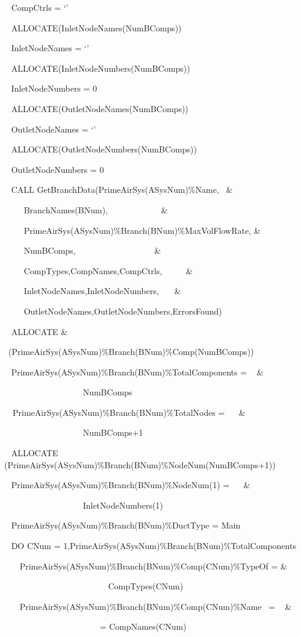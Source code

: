 ~ CompCtrls = `'

~ ALLOCATE(InletNodeNames(NumBComps))

~ InletNodeNames = `'

~ ALLOCATE(InletNodeNumbers(NumBComps))

~ InletNodeNumbers = 0

~ ALLOCATE(OutletNodeNames(NumBComps))

~ OutletNodeNames = `'

~ ALLOCATE(OutletNodeNumbers(NumBComps))

~ OutletNodeNumbers = 0

~ CALL GetBranchData(PrimeAirSys(ASysNum)\%Name,~ \&

~~~~ BranchNames(BNum),~~~~~~~~~~~~ \&

~~~~ PrimeAirSys(ASysNum)\%Branch(BNum)\%MaxVolFlowRate, \&

~~~~ NumBComps,~~~~~~~~~~~~~~~~~~ \&

~~~~ CompTypes,CompNames,CompCtrls, ~~~~~\&

~~~~ InletNodeNames,InletNodeNumbers,~~~ \&

~~~~ OutletNodeNames,OutletNodeNumbers,ErrorsFound)

~ ALLOCATE \&

~(PrimeAirSys(ASysNum)\%Branch(BNum)\%Comp(NumBComps))

~ PrimeAirSys(ASysNum)\%Branch(BNum)\%TotalComponents = ~ \&

~~~~~~~~~~~~~~~~~~ NumBComps

~~PrimeAirSys(ASysNum)\%Branch(BNum)\%TotalNodes = ~~ \&

~~~~~~~~~~~~~~~~~~ NumBComps+1

~ ALLOCATE (PrimeAirSys(ASysNum)\%Branch(BNum)\%NodeNum(NumBComps+1))

~ PrimeAirSys(ASysNum)\%Branch(BNum)\%NodeNum(1) = ~~ \&

~~~~~~~~~~~~~~~~~~ InletNodeNumbers(1)

~ PrimeAirSys(ASysNum)\%Branch(BNum)\%DuctType = Main

~ DO CNum = 1,PrimeAirSys(ASysNum)\%Branch(BNum)\%TotalComponents

~~~ PrimeAirSys(ASysNum)\%Branch(BNum)\%Comp(CNum)\%TypeOf = \&

~~~~~~~~~~~~~~~~~~~~~~~~ CompTypes(CNum)

~~~ PrimeAirSys(ASysNum)\%Branch(BNum)\%Comp(CNum)\%Name~ = ~ \&

~~~~~~~~~~~~~~~~~~~~~~ = CompNames(CNum)

